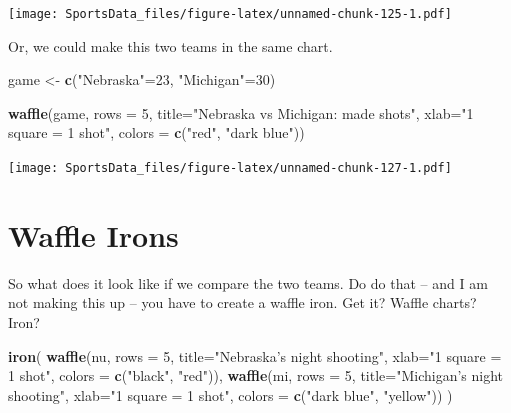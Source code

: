 \documentclass[]{book}
\newenvironment{Shaded}{\begin{snugshade}}{\end{snugshade}}
\newcommand{\KeywordTok}[1]{\textcolor[rgb]{0.13,0.29,0.53}{\textbf{#1}}}
\newcommand{\DataTypeTok}[1]{\textcolor[rgb]{0.13,0.29,0.53}{#1}}
\newcommand{\DecValTok}[1]{\textcolor[rgb]{0.00,0.00,0.81}{#1}}
\newcommand{\StringTok}[1]{\textcolor[rgb]{0.31,0.60,0.02}{#1}}
\newcommand{\NormalTok}[1]{#1}
\begin{document}
\texttt{[image: SportsData\_files/figure-latex/unnamed-chunk-125-1.pdf]}

Or, we could make this two teams in the same chart.

\begin{Shaded}
\begin{Highlighting}[]
\NormalTok{game <-}\StringTok{ }\KeywordTok{c}\NormalTok{(}\StringTok{"Nebraska"}\NormalTok{=}\DecValTok{23}\NormalTok{, }\StringTok{"Michigan"}\NormalTok{=}\DecValTok{30}\NormalTok{)}
\end{Highlighting}
\end{Shaded}

\begin{Shaded}
\begin{Highlighting}[]
\KeywordTok{waffle}\NormalTok{(game, }\DataTypeTok{rows =} \DecValTok{5}\NormalTok{, }\DataTypeTok{title=}\StringTok{"Nebraska vs Michigan: made shots"}\NormalTok{, }\DataTypeTok{xlab=}\StringTok{"1 square = 1 shot"}\NormalTok{, }\DataTypeTok{colors =} \KeywordTok{c}\NormalTok{(}\StringTok{"red"}\NormalTok{, }\StringTok{"dark blue"}\NormalTok{))}
\end{Highlighting}
\end{Shaded}

\texttt{[image: SportsData\_files/figure-latex/unnamed-chunk-127-1.pdf]}

\section{Waffle Irons}\label{waffle-irons}

So what does it look like if we compare the two teams. Do do that -- and
I am not making this up -- you have to create a waffle iron. Get it?
Waffle charts? Iron?

\begin{Shaded}
\begin{Highlighting}[]
\KeywordTok{iron}\NormalTok{(}
 \KeywordTok{waffle}\NormalTok{(nu, }\DataTypeTok{rows =} \DecValTok{5}\NormalTok{, }\DataTypeTok{title=}\StringTok{"Nebraska's night shooting"}\NormalTok{, }\DataTypeTok{xlab=}\StringTok{"1 square = 1 shot"}\NormalTok{, }\DataTypeTok{colors =} \KeywordTok{c}\NormalTok{(}\StringTok{"black"}\NormalTok{, }\StringTok{"red"}\NormalTok{)),}
 \KeywordTok{waffle}\NormalTok{(mi, }\DataTypeTok{rows =} \DecValTok{5}\NormalTok{, }\DataTypeTok{title=}\StringTok{"Michigan's night shooting"}\NormalTok{, }\DataTypeTok{xlab=}\StringTok{"1 square = 1 shot"}\NormalTok{, }\DataTypeTok{colors =} \KeywordTok{c}\NormalTok{(}\StringTok{"dark blue"}\NormalTok{, }\StringTok{"yellow"}\NormalTok{))}
\NormalTok{)}
\end{Highlighting}
\end{Shaded}
\end{document}
